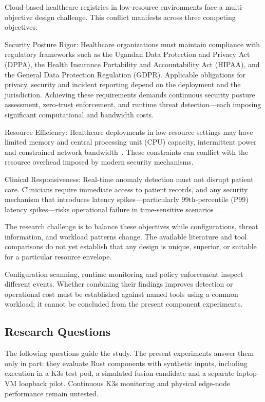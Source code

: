 \documentclass{ieeeaccess}
\begin{document}
Cloud-based healthcare registries in low-resource environments face a multi-objective design challenge. This conflict manifests across three competing objectives:

{Security Posture Rigor:} Healthcare organizations must maintain compliance with regulatory frameworks such as the Ugandan Data Protection and Privacy Act (DPPA), the Health Insurance Portability and Accountability Act (HIPAA), and the General Data Protection Regulation (GDPR). Applicable obligations for privacy, security and incident reporting depend on the deployment and the jurisdiction. Achieving these requirements demands continuous security posture assessment, zero-trust enforcement, and runtime threat detection---each imposing significant computational and bandwidth costs.

{Resource Efficiency:} Healthcare deployments in low-resource settings may have limited memory and central processing unit (CPU) capacity, intermittent power and constrained network bandwidth~\cite{b3,b11}. These constraints can conflict with the resource overhead imposed by modern security mechanisms.

{Clinical Responsiveness:} Real-time anomaly detection must not disrupt patient care. Clinicians require immediate access to patient records, and any security mechanism that introduces latency spikes---particularly 99th-percentile (P99) latency spikes---risks operational failure in time-sensitive scenarios~\cite{b14,b15}.

The research challenge is to balance these objectives while configurations, threat information, and workload patterns change. The available literature and tool comparisons do not yet establish that any design is unique, superior, or suitable for a particular resource envelope.

Configuration scanning, runtime monitoring and policy enforcement inspect different events. Whether combining their findings improves detection or operational cost must be established against named tools using a common workload; it cannot be concluded from the present component experiments.

\subsection{Research Questions}
\label{subsec:rq}

The following questions guide the study. The present experiments answer them only in part: they evaluate Rust components with synthetic inputs, including execution in a K3s test pod, a simulated fusion candidate and a separate laptop-VM loopback pilot. Continuous K3s monitoring and physical edge-node performance remain untested.
\end{document}
